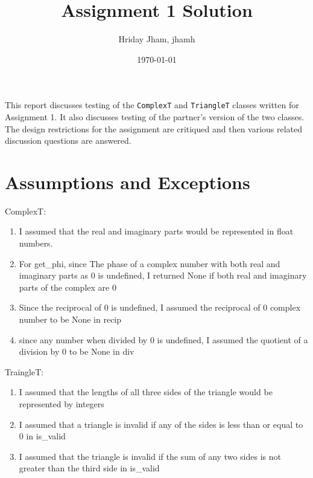 \documentclass[12pt]{article}
\title{Assignment 1 Solution}
\author{Hriday Jham, jhamh}
\date{\today}
\begin{document}
\maketitle

This report discusses testing of the \verb|ComplexT| and \verb|TriangleT|
classes written for Assignment 1. It also discusses testing of the partner's
version of the two classes. The design restrictions for the assignment
are critiqued and then various related discussion questions are answered.

\section{Assumptions and Exceptions} \label{AssumptAndExcept}
ComplexT:

\begin{enumerate}

\item I assumed that the real and imaginary parts would be represented in float numbers.  

\item For get\_phi, since The phase of a complex number with both real and imaginary parts as 0 is undefined, I returned None if both real and imaginary parts of the complex are 0

\item Since the reciprocal of 0 is undefined, I assumed the reciprocal of 0 complex number to be None in recip

\item since any number when divided by 0 is undefined, I assumed the quotient of a division by 0 to be None in div

\end{enumerate}

\noindent TraingleT:

\begin{enumerate}

\item I assumed that the lengths of all three sides of the triangle would be represented by integers

\item I assumed that a triangle is invalid if any of the sides is less than or equal to 0 in is\_valid

\item I assumed that the triangle is invalid if the sum of any two sides is not greater than the third side in is\_valid

\end{enumerate}
\end{document}
